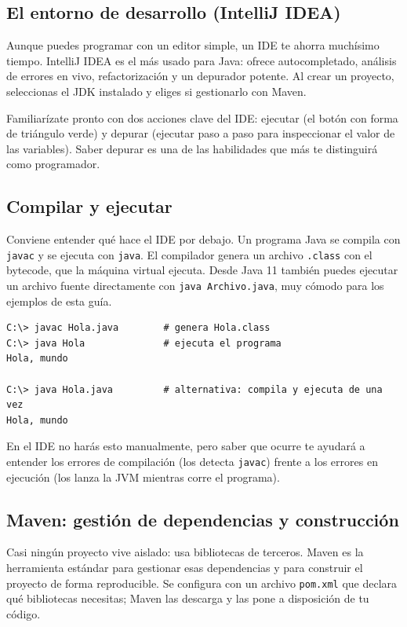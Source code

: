 \documentclass[11pt]{article}
\begin{document}
\subsection{El entorno de desarrollo (IntelliJ IDEA)}
Aunque puedes programar con un editor simple, un IDE te ahorra muchísimo tiempo. IntelliJ IDEA es el más usado para Java: ofrece autocompletado, análisis de errores en vivo, refactorización y un depurador potente. Al crear un proyecto, seleccionas el JDK instalado y eliges si gestionarlo con Maven.

Familiarízate pronto con dos acciones clave del IDE: ejecutar (el botón con forma de triángulo verde) y depurar (ejecutar paso a paso para inspeccionar el valor de las variables). Saber depurar es una de las habilidades que más te distinguirá como programador.

\subsection{Compilar y ejecutar}
Conviene entender qué hace el IDE por debajo. Un programa Java se compila con \texttt{javac} y se ejecuta con \texttt{java}. El compilador genera un archivo \texttt{.\allowbreak{}class} con el bytecode, que la máquina virtual ejecuta. Desde Java 11 también puedes ejecutar un archivo fuente directamente con \texttt{java Archivo.\allowbreak{}java}, muy cómodo para los ejemplos de esta guía.

\begin{cajacodigo}
\begin{lstlisting}[style=markup]
C:\> javac Hola.java        # genera Hola.class
C:\> java Hola              # ejecuta el programa
Hola, mundo

C:\> java Hola.java         # alternativa: compila y ejecuta de una vez
Hola, mundo
\end{lstlisting}
\end{cajacodigo}
\vspace{2pt}
En el IDE no harás esto manualmente, pero saber que ocurre te ayudará a entender los errores de compilación (los detecta \texttt{javac}) frente a los errores en ejecución (los lanza la JVM mientras corre el programa).

\subsection{Maven: gestión de dependencias y construcción}
Casi ningún proyecto vive aislado: usa bibliotecas de terceros. Maven es la herramienta estándar para gestionar esas dependencias y para construir el proyecto de forma reproducible. Se configura con un archivo \texttt{pom.\allowbreak{}xml} que declara qué bibliotecas necesitas; Maven las descarga y las pone a disposición de tu código.
\end{document}

